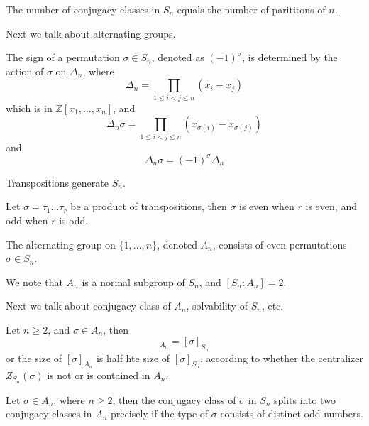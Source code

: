\documentclass[openany]{book}
\begin{document}
\begin{cor}
    The number of conjugacy classes in $S_n$ equals the number of parititons of $n$.
\end{cor}
Next we talk about alternating groups.
\begin{defn}[sign]
    The sign of a permutation $\sigma\in S_n$, denoted as $(-1)^\sigma$, is determined by the action of $\sigma$ on $\Delta_n$, where 
    \begin{equation*}
        \Delta_n=\prod_{1\leq i<j\leq n}(x_i-x_j)
    \end{equation*}
    which is in $\mathbb{Z}[x_1,\dots,x_n]$, and 
    \begin{equation*}
        \Delta_n\sigma=\prod_{1\leq i<j\leq n}(x_{\sigma(i)}-x_{\sigma(j)})
    \end{equation*}
    and 
    \begin{equation*}
        \Delta_n\sigma=(-1)^\sigma\Delta_n
    \end{equation*}
\end{defn}
\begin{lem}
    Transpositions generate $S_n$.
\end{lem}
\begin{lem}
    Let $\sigma=\tau_1\dots\tau_r$ be a product of transpositions, then $\sigma$ is even when $r$ is even, and odd when $r$ is odd.
\end{lem}
\begin{defn}
    The alternating group on $\{1,\dots,n\}$, denoted $A_n$, consists of even permutations $\sigma\in S_n$. 

    We note that $A_n$ is a normal subgroup of $S_n$, and $[S_n:A_n]=2$.
\end{defn}
Next we talk about conjugacy class of $A_n$, solvability of $S_n$, etc.
\begin{lem}
    Let $n\geq 2$, and $\sigma\in A_n$, then 
    \begin{equation*}
        [\sigma]_{A_n}=[\sigma]_{S_n}
    \end{equation*}
    or the size of $[\sigma]_{A_n}$ is half hte size of $[\sigma]_{S_n}$, according to whether the centralizer $Z_{S_n}(\sigma)$ is not or is contained in $A_n$.
\end{lem}
\begin{prop}
    Let $\sigma\in A_n$, where $n\geq 2$, then the conjugacy class of $\sigma$ in $S_n$ splits into two conjugacy classes in $A_n$ precisely if the type of $\sigma$ consists of distinct odd numbers.
\end{prop}
\end{document}
